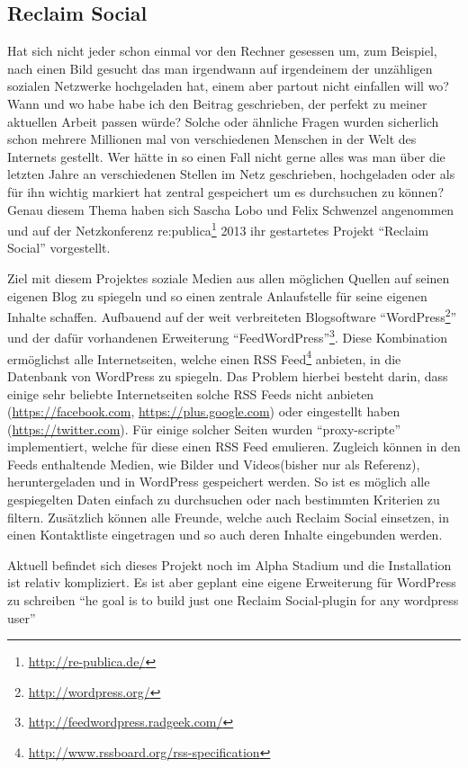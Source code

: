 \subsection{Reclaim Social} %
\label{sub:verw_arbeiten_reclaim_social}

Hat sich nicht jeder schon einmal vor den Rechner gesessen um, zum Beispiel, nach einen Bild gesucht das man irgendwann auf irgendeinem der unzähligen sozialen Netzwerke hochgeladen hat, einem aber partout nicht einfallen will wo? Wann und wo habe habe ich den Beitrag geschrieben, der perfekt zu meiner aktuellen Arbeit passen würde? Solche oder ähnliche Fragen wurden sicherlich schon mehrere Millionen mal von verschiedenen Menschen in der Welt des Internets gestellt. Wer hätte in so einen Fall nicht gerne alles was man über die letzten Jahre an verschiedenen Stellen im Netz geschrieben, hochgeladen oder als für ihn wichtig markiert hat zentral gespeichert um es durchsuchen zu können? Genau diesem Thema haben sich Sascha Lobo und Felix Schwenzel angenommen und auf der Netzkonferenz re:publica\footnote{\url{http://re-publica.de/}} 2013 ihr gestartetes Projekt \enquote{Reclaim Social} \cite{Schwenzel2013} vorgestellt.

\medskip

Ziel mit diesem Projektes soziale Medien aus allen möglichen Quellen auf seinen eigenen Blog zu spiegeln und so einen zentrale Anlaufstelle für seine eigenen Inhalte schaffen. Aufbauend auf der weit verbreiteten Blogsoftware \enquote{WordPress\footnote{\url{http://wordpress.org/}}} und der dafür vorhandenen Erweiterung \enquote{FeedWordPress}\footnote{\url{http://feedwordpress.radgeek.com/}}. Diese Kombination ermöglichst alle Internetseiten, welche einen RSS Feed\footnote{\url{http://www.rssboard.org/rss-specification}} anbieten, in die Datenbank von WordPress zu spiegeln. Das Problem hierbei besteht darin, dass einige sehr beliebte Internetseiten solche RSS Feeds nicht anbieten (\url{https://facebook.com}, \url{https://plus.google.com}) oder eingestellt haben (\url{https://twitter.com}). Für einige solcher Seiten wurden \enquote{proxy-scripte}\cite[Tecg Specs Details]{Schwenzel2013} implementiert, welche für diese einen RSS Feed emulieren. Zugleich können in den Feeds enthaltende Medien, wie Bilder und Videos(bisher nur als Referenz), heruntergeladen und in WordPress gespeichert werden. So ist es möglich alle gespiegelten Daten einfach zu durchsuchen oder nach bestimmten Kriterien zu filtern. Zusätzlich können alle Freunde, welche auch Reclaim Social einsetzen, in einen Kontaktliste eingetragen und so auch deren Inhalte eingebunden werden.

\medskip

Aktuell befindet sich dieses Projekt noch im Alpha Stadium und die Installation ist relativ kompliziert. Es ist aber geplant eine eigene Erweiterung für WordPress zu schreiben \enquote{he goal is to build just one Reclaim Social-plugin for any wordpress user}\cite[How Does It Work]{Schwenzel2013}


